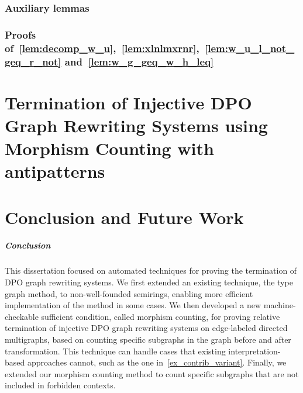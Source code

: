 \documentclass{report}
\begin{document}
\subsection*{Auxiliary lemmas}

\subsection*{Proofs of~\autoref{lem:decomp_w_u},~\autoref{lem:xlnlmxrnr},~\autoref{lem:w_u_l_not_geq_r_not} and~\autoref{lem:w_g_geq_w_h_leq}}
\label{sec:appendix:a}


% 



% 




\chapter{Termination of Injective DPO Graph Rewriting
Systems using Morphism Counting with antipatterns}
 

 

\chapter{Conclusion and Future Work}
\paragraph{Conclusion}
This dissertation focused on automated techniques for proving the termination of DPO graph rewriting systems.
We first extended an existing technique, the type graph method, to non-well-founded semirings, enabling more efficient implementation of the method in some cases.
We then developed a new machine-checkable sufficient condition, called morphism counting, for proving relative termination of injective DPO graph rewriting systems on edge-labeled directed multigraphs, based on counting specific subgraphs in the graph before and after transformation. This technique can handle cases that existing interpretation-based approaches cannot, such as the one in~\autoref{ex_contrib_variant}.
Finally, we extended our morphism counting method to count specific subgraphs that are not included in forbidden contexts.
\end{document}
